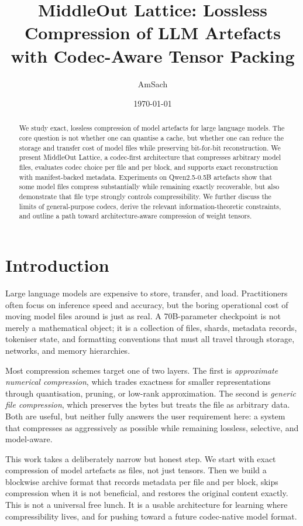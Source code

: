 \documentclass[11pt]{article}
\title{MiddleOut Lattice: Lossless Compression of LLM Artefacts with Codec-Aware Tensor Packing}
\author{AmSach}
\date{\today}
\begin{document}
\maketitle

\begin{abstract}
We study exact, lossless compression of model artefacts for large language models. The core question is not whether one can quantise a cache, but whether one can reduce the storage and transfer cost of model files while preserving bit-for-bit reconstruction. We present MiddleOut Lattice, a codec-first architecture that compresses arbitrary model files, evaluates codec choice per file and per block, and supports exact reconstruction with manifest-backed metadata. Experiments on Qwen2.5-0.5B artefacts show that some model files compress substantially while remaining exactly recoverable, but also demonstrate that file type strongly controls compressibility. We further discuss the limits of general-purpose codecs, derive the relevant information-theoretic constraints, and outline a path toward architecture-aware compression of weight tensors.
\end{abstract}

\section{Introduction}

Large language models are expensive to store, transfer, and load. Practitioners often focus on inference speed and accuracy, but the boring operational cost of moving model files around is just as real. A 70B-parameter checkpoint is not merely a mathematical object; it is a collection of files, shards, metadata records, tokeniser state, and formatting conventions that must all travel through storage, networks, and memory hierarchies.

Most compression schemes target one of two layers. The first is \emph{approximate numerical compression}, which trades exactness for smaller representations through quantisation, pruning, or low-rank approximation. The second is \emph{generic file compression}, which preserves the bytes but treats the file as arbitrary data. Both are useful, but neither fully answers the user requirement here: a system that compresses as aggressively as possible while remaining lossless, selective, and model-aware.

This work takes a deliberately narrow but honest step. We start with exact compression of model artefacts as files, not just tensors. Then we build a blockwise archive format that records metadata per file and per block, skips compression when it is not beneficial, and restores the original content exactly. This is not a universal free lunch. It is a usable architecture for learning where compressibility lives, and for pushing toward a future codec-native model format.
\end{document}
